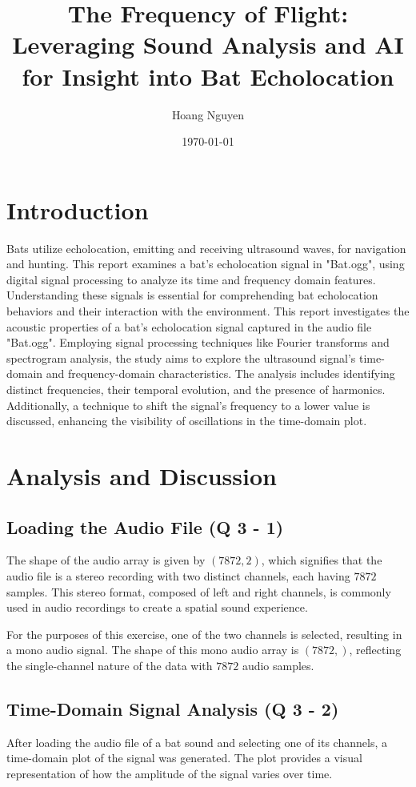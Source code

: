 \documentclass[12pt]{article}
\title{The Frequency of Flight: Leveraging Sound Analysis and AI for Insight into Bat Echolocation}
\author{Hoang Nguyen}
\date{\today}
\begin{document}
\maketitle

\section{Introduction}
    \text Bats utilize echolocation, emitting and receiving ultrasound waves, for navigation and hunting. This report examines a bat's echolocation signal in "Bat.ogg", using digital signal processing to analyze its time and frequency domain features. Understanding these signals is essential for comprehending bat echolocation behaviors and their interaction with the environment.  This report investigates the acoustic properties of a bat's echolocation signal captured in the audio file "Bat.ogg". 
    Employing signal processing techniques like Fourier transforms and spectrogram analysis, the study aims to explore the ultrasound signal's time-domain and frequency-domain characteristics. 
    The analysis includes identifying distinct frequencies, their temporal evolution, and the presence of harmonics. Additionally, a technique to shift the signal's frequency to a lower value is discussed, enhancing the visibility of oscillations in the time-domain plot.

    
\section{Analysis and Discussion}
\subsection{Loading the Audio File (Q 3 - 1)}
The shape of the audio array is given by $(7872, 2)$, which signifies that the audio file is a stereo recording with two distinct channels, each having $7872$ samples. This stereo format, composed of left and right channels, is commonly used in audio recordings to create a spatial sound experience. 

For the purposes of this exercise, one of the two channels is selected, resulting in a mono audio signal. The shape of this mono audio array is $(7872,)$, reflecting the single-channel nature of the data with $7872$ audio samples.

\subsection{Time-Domain Signal Analysis (Q 3 - 2)}
After loading the audio file of a bat sound and selecting one of its channels, a time-domain plot of the signal was generated. The plot provides a visual representation of how the amplitude of the signal varies over time.
\end{document}
